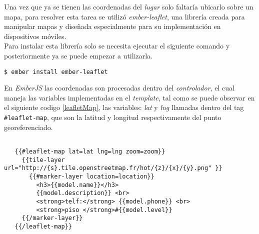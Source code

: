 Una vez que ya se tienen las coordenadas del \emph{lugar} solo faltaría ubicarlo sobre un mapa, para resolver esta tarea se utilizó \emph{ember-leaflet}, una librería creada para manipular mapas y diseñada especialmente  para su implementación en dispositivos móviles.\\

Para instalar esta librería solo se necesita ejecutar el siguiente comando y posteriormente ya se puede empezar a utilizarla.\\

\begin{verbatim}
$ ember install ember-leaflet
\end{verbatim}


En \emph{EmberJS} las coordenadas son procesadas dentro del \emph{controlador}, el cual maneja las variables implementadas en el \emph{template}, tal como se puede observar en el siguiente codigo \ref{leafletMap}, las variables: \emph{lat} y \emph{lng} llamadas dentro del tag \verb|#leaflet-map|, que son la latitud y longitud respectivamente del punto georeferenciado. \\


\begin{center}
 \begin{lstlisting}[label=leafletMap,caption=Método para obtener la información de un lugar.]

   {{#leaflet-map lat=lat lng=lng zoom=zoom}}
     {{tile-layer url="http://{s}.tile.openstreetmap.fr/hot/{z}/{x}/{y}.png" }}
       {{#marker-layer location=location}}
         <h3>{{model.name}}</h3>
         {{model.description}} <br>
         <strong>telf:</strong> {{model.phone}} <br>
         <strong>piso </strong>#{{model.level}}
     {{/marker-layer}}
   {{/leaflet-map}}

 \end{lstlisting}
\end{center}

